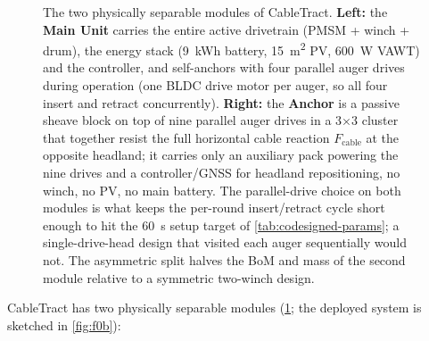 \documentclass[11pt,a4paper]{article}
\begin{document}
\begin{figure}[H]
{%
}
\caption{The two physically separable modules of CableTract. \textbf{Left:} the \textbf{Main Unit} carries the entire active drivetrain (PMSM + winch + drum), the energy stack (\SI{9}{\kWh} battery, \SI{15}{\meter\squared} PV, \SI{600}{\watt} VAWT) and the controller, and self-anchors with four parallel auger drives during operation (one BLDC drive motor per auger, so all four insert and retract concurrently). \textbf{Right:} the \textbf{Anchor} is a passive sheave block on top of nine parallel auger drives in a 3$\times$3 cluster that together resist the full horizontal cable reaction $F_{\text{cable}}$ at the opposite headland; it carries only an auxiliary pack powering the nine drives and a controller/GNSS for headland repositioning, no winch, no PV, no main battery. The parallel-drive choice on both modules is what keeps the per-round insert/retract cycle short enough to hit the \SI{60}{\second} setup target of \cref{tab:codesigned-params}; a single-drive-head design that visited each auger sequentially would not. The asymmetric split halves the BoM and mass of the second module relative to a symmetric two-winch design.}
\label{fig:f0a}
\end{figure}

CableTract has two physically separable modules (\cref{fig:f0a}; the deployed system is sketched in \cref{fig:f0b}):
\end{document}
